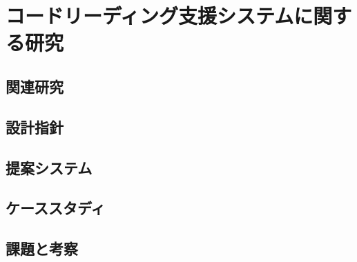 \section{コードリーディング支援システムに関する研究}

\subsection{関連研究}


\subsection{設計指針}

\subsection{提案システム}

\subsection{ケーススタディ}

\subsection{課題と考察}


